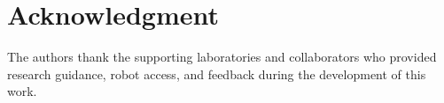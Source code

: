 \documentclass[journal]{IEEEtran}
\begin{document}
\section*{Acknowledgment}
The authors thank the supporting laboratories and collaborators who provided research guidance, robot access, and feedback during the development of this work.



\end{document}
